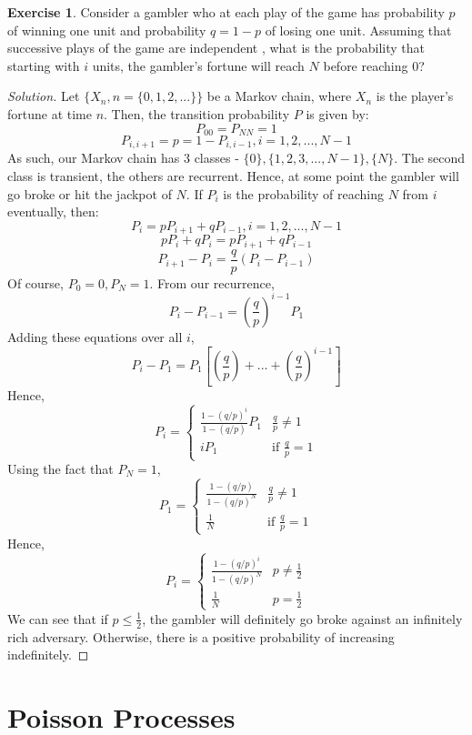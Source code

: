 \documentclass[12pt,letterpaper]{book}
\theoremstyle{definition}
\newtheorem*{exercise}{Exercise}
\newenvironment{solution}
  {\renewcommand\qedsymbol{$\blacksquare$}\begin{proof}[Solution]}
  {\end{proof}}
\begin{document}
\begin{exercise}
  Consider a gambler who at each play of the game has probability $p$ of winning one unit and probability $q=1-p$ of losing one unit. Assuming that successive plays of the game are independent , what is the probability that starting with $i$ units, the gambler's fortune will reach $N$ before reaching 0?  
\end{exercise}
\begin{solution}
  Let $\{X_n,n=\{0,1,2,...\}\}$ be a Markov chain, where $X_n$ is the player's fortune at time $n$. Then, the transition probability $P$ is given by:
  \[P_{00} = P_{NN} = 1\]
  \[P_{i,i+1} = p = 1-P_{i,i-1}, i = 1,2,...,N-1\]
  As such, our Markov chain has 3 classes - $\{0\}, \{1,2,3,...,N-1\}, \{N\}$. The second class is transient, the others are recurrent. Hence, at some point the gambler will go broke or hit the jackpot of $N$.
  If $P_i$ is the probability of reaching $N$ from $i$ eventually, then:
  \[P_i = pP_{i+1} + qP_{i-1}, i = 1,2,...,N-1\]
  \[pP_i + qP_i = pP_{i+1} + qP_{i-1}\]
  \[P_{i+1} - P_i = \frac{q}{p}(P_i - P_{i-1})\]
  Of course, $P_0 = 0, P_N = 1$. From our recurrence, 
  \[P_i - P_{i-1} = \left( \frac{q}{p} \right)^{i-1} P_1\]
  Adding these equations over all $i$,
  \[P_i - P_1 = P_1 \left[\left(\frac{q}{p}\right) + ... + \left(\frac{q}{p} \right)^{i-1}  \right]\]
  Hence, 
  \[P_i = \begin{cases}
    \frac{1-(q/p)^i}{1-(q/p)}P_1 & \frac{q}{p} \neq 1 \\
    iP_1 & \text{if } \frac{q}{p} = 1
  \end{cases}\]
  Using the fact that $P_N = 1$,
  \[P_1 = \begin{cases}
    \frac{1-(q/p)}{1-(q/p)^N} & \frac{q}{p} \neq 1 \\
    \frac{1}{N} & \text{if } \frac{q}{p} = 1
  \end{cases}\]
  Hence,
  \[P_i = \begin{cases}
    \frac{1-(q/p)^i}{1-(q/p)^N} & p \neq \frac{1}{2} \\
    \frac{1}{N} & p = \frac{1}{2}
  \end{cases}\]
  We can see that if $p \leq \frac{1}{2}$, the gambler will definitely go broke against an infinitely rich adversary. Otherwise, there is a positive probability of increasing indefinitely.
\end{solution}

\chapter{Poisson Processes}
\end{document}
